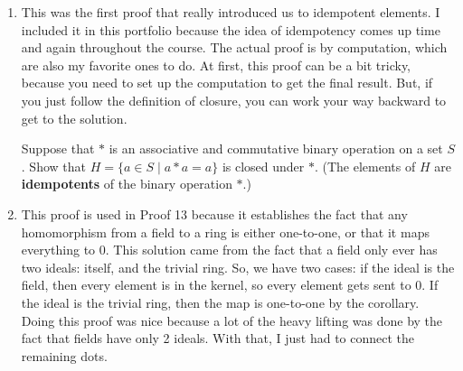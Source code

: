 \begin{enumerate}[label=\textbf{\arabic*.}]
{    }
\newpage
    \item This was the first proof that really introduced us to idempotent elements. I included it in this portfolio because the idea of idempotency comes up time and again throughout the course. The actual proof is by computation, which are also my favorite ones to do. At first, this proof can be a bit tricky, because you need to set up the computation to get the final result. But, if you just follow the definition of closure, you can work your way backward to get to the solution. 

    \begin{problem}
        Suppose that \(*\) is an associative and commutative binary operation on a set \(S\). Show that \(H = \{a \in S \mid a * a = a\}\) is closed under \(*\). (The elements of \(H\) are \textbf{idempotents} of the binary operation \(*\).)
    \end{problem}
    \item This proof is used in Proof 13 because it establishes the fact that any homomorphism from a field to a ring is either one-to-one, or that it maps everything to 0. This solution came from the fact that a field only ever has two ideals: itself, and the trivial ring. So, we have two cases: if the ideal is the field, then every element is in the kernel, so every element gets sent to 0. If the ideal is the trivial ring, then the map is one-to-one by the corollary. Doing this proof was nice because a lot of the heavy lifting was done by the fact that fields have only 2 ideals. With that, I just had to connect the remaining dots. 
    

\end{enumerate}
